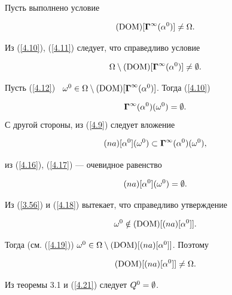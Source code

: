\begin{pf}


Пусть выполнено условие


\begin{equation}\label{4.11}


(\DOM)[{{\mG}^\infty}({\alpha}^0)] \ne \Om.


\end{equation}


Из (\ref{4.10}), (\ref{4.11}) следует, что справедливо условие


\begin{equation}\label{4.12}


\Om \setminus (\DOM)[{{\mG}^\infty}({\alpha}^0)] \ne \emp.


\end{equation}


Пусть (\ref{4.12}) \ ${{\omega}^0} \in \Om \setminus


(\DOM)[{{\mG}^\infty}({\alpha}^0)]$. Тогда (\ref{4.10})


\begin{equation}\label{4.16}


{{\mG}^\infty}({\alpha}^0)({{\omega}^0}) = \emp.


\end{equation}С другой стороны, из (\ref{4.9}) следует вложение


\begin{equation}\label{4.17}


(na)[{\alpha}^0]({\omega}^0) \subset


{{\mG}^\infty}({\alpha}^0)({\omega}^0),


\end{equation}


из (\ref{4.16}), (\ref{4.17}) --- очевидное равенство


\begin{equation}\label{4.18}


(na)[{\alpha}^0]({\omega}^0) = \emp.


\end{equation}


Из (\ref{3.56}) и (\ref{4.18}) вытекает, что справедливо утверждение


\begin{equation}\label{4.19}


{{\omega}^0} \notin (\DOM)[(na)[{\alpha}^0]].


\end{equation}


Тогда (см. (\ref{4.19})) ${{\omega}^0} \in \Om \setminus


(\DOM)[(na)[{\alpha}^0]]$. Поэтому


\begin{equation}\label{4.21}


(\DOM)[(na)[{\alpha}^0]] \ne \Om.


\end{equation}


Из теоремы 3.1 и (\ref{4.21}) следует ${Q^0} = \emptyset$.


\end{pf}





